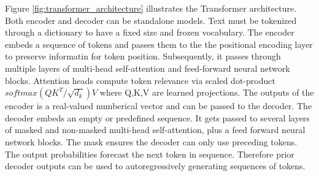 Figure \ref{fig:transformer_architecture} illustrates the Transformer architecture. Both encoder and decoder can be standalone models. Text must be tokenized through a dictionary to have a fixed size and frozen vocabulary.
The encoder embeds a sequence of tokens and passes them to the the positional encoding layer to preserve informatin for token position. Subsequently, it passes through multiple layers of multi-head self-attention and feed-forward neural network blocks. Attention heads compute token relevance via scaled dot-product 
$softmax(QK^T/\sqrt{d_k})V$ where Q,K,V are learned projections. The outputs of the encoder is a real-valued numberical vector and can be passed to the decoder. 
The decoder embeds an empty or predefined sequence. It gets passed to several layers of masked and non-masked multi-head self-attention, plus a feed forward neural network blocks. The mask ensures the decoder can only use preceding tokens. The output probabilities forecast the next token in sequence. Therefore prior decoder outputs can be used to autoregressively generating sequences of tokens.





